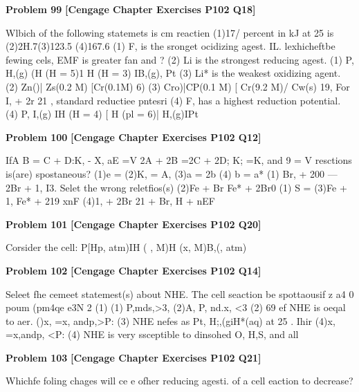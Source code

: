 \begin{problembox}
\textbf{Problem 99} \hfill \textbf{[Cengage Chapter Exercises P102 Q18]}
\label{q:ext-cng-th-99}

Wlbich of the following statemets is  cm
reactien
(1)17/ percent 
in kJ at 25  is
(2)2H.7(3)123.5
(4)167.6
(1) F, is the sronget ocidizing agest.
IL. lexhicheftbe fewing cels, EMF is greater fan  and ?
(2) Li is the strongest reducing agest.
(1) P, H,(g) (H (H = 5)1 H (H = 3) IB,(g), Pt
(3) Li* is the weakest oxidizing agent.
(2) Zn()| Zs(0.2 M) [Cr(0.1M)  6)
(3) Cro)|CP(0.1 M) [ Cr(9.2 M)/ Cw(s)
19, For I, + 2r   21 , standard reductiee pntesri
(4) F, has a highest reduction potential.
(4) P, I,(g) IH  (H = 4) [ H (pl = 6)| H,(g)IPt
\end{problembox}

\begin{problembox}
\textbf{Problem 100} \hfill \textbf{[Cengage Chapter Exercises P102 Q12]}
\label{q:ext-cng-th-100}

IfA  B = C + D:K, - X, aE  =V
2A + 2B =2C + 2D; K; =K, and 9 =  V
resctions is(are) spostaneous?
(1)e = 
(2)K, = A, (3)a = 2b
(4) b = a*
(1) Br, + 200 ---  2Br + 1,
I3. Selet the wrong reletfios(s)
(2)Fe + Br   Fe* + 2Br0
(1) S =
(3)Fe + 1,   Fe* + 219
xnF
(4)1, + 2Br   21  + Br,
H + nEF
\end{problembox}

\begin{problembox}
\textbf{Problem 101} \hfill \textbf{[Cengage Chapter Exercises P102 Q20]}
\label{q:ext-cng-th-101}

Corsider the cell:
P[Hp, atm)IH  ( , M)H  (x, M)B,(, atm)
\end{problembox}

\begin{problembox}
\textbf{Problem 102} \hfill \textbf{[Cengage Chapter Exercises P102 Q14]}
\label{q:ext-cng-th-102}

Seleet fhe cemeet statemest(s) about NHE.
The cell seaction be spottaousif
z a4 0 poum (pm4qe e3N 2 (1)
(1) P,mds,>3,
(2)A, P, nd.x, <3
(2) 69 ef NHE is oeqal to aer.
()x, =x, andp,>P:
(3) NHE nefes as Pt, H;,(giH*(aq) at 25 .
Ihir
(4)x, =x,andp, <P:
(4) NHE is very ssceptible to dinsohed O, H,S, and all
\end{problembox}

\begin{problembox}
\textbf{Problem 103} \hfill \textbf{[Cengage Chapter Exercises P102 Q21]}
\label{q:ext-cng-th-103}

Whichfe foling chages will ce  e 
ofher reducing agesti.
of a cell eaction to decrease?
\end{problembox}

